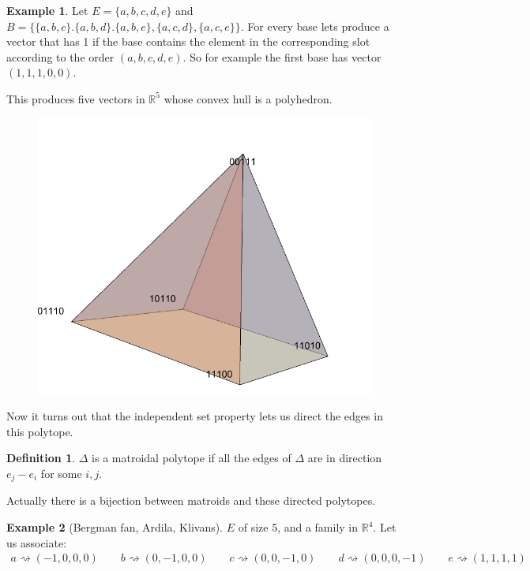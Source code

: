 \documentclass{article}
\theoremstyle{definition}
\newtheorem*{defn}{Definition}
\newtheorem{ex}{Example}
\newcommand{\R}{\mathbb{R}}
\begin{document}
\begin{ex}
	Let  $E=\{a,b,c,d,e\}$ and $B=\{\{a,b,c\}.\{a,b,d\}.\{a,b,e\},\{a,c,d\},\{a,c,e\}\}$. For every base lets produce a vector that has 1 if the base contains the element in the corresponding slot according to the order $(a,b,c,d,e)$. So for example the first base has vector $(1,1,1,0,0)$.\par
	This produces five vectors in $\R^5$ whose convex hull is a polyhedron.
	\begin{figure}
		\centering
		\includegraphics[width=0.5\linewidth]{10}
		\caption*{}
		\label{fig:10}
	\end{figure}
	Now it turns out that the independent set property lets us direct the edges in this polytope. 
\end{ex}
\begin{defn}
	$\Delta$ is a matroidal polytope if all the edges of $\Delta$ are in direction $e_j-e_i$ for some $i,j$.
\end{defn}
Actually there is a bijection between matroids and these directed polytopes.
\begin{ex}[Bergman fan, Ardila, Klivans]
	$E$ of size 5, and a family in $\R^4$. Let us associate:
	\begin{align*}
		a\rightsquigarrow(-1,0,0,0)\qquad b\rightsquigarrow(0,-1,0,0)\qquad c\rightsquigarrow(0,0,-1,0)\qquad d\rightsquigarrow(0,0,0,-1) \qquad e\rightsquigarrow(1,1,1,1)
	\end{align*}
\end{ex}
\end{document}
